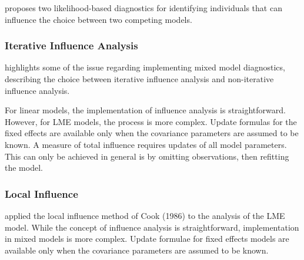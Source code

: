 \documentclass[12pt, a4paper]{report}
\theoremstyle{plain}
\theoremstyle{definition}
\theoremstyle{remark}
\begin{document}
	
	
	\citet{Demi} proposes two likelihood-based diagnostics for identifying individuals that can influence the choice between two competing models.
	
	
	
	\subsubsection{Iterative Influence Analysis}
	
	\citet{schabenberger} highlights some of the issue regarding implementing mixed model diagnostics, describing  the choice between  iterative influence analysis and  non-iterative influence analysis.
	
	For linear models, the implementation of influence analysis is straightforward. However, for LME models, the process is more complex. Update formulas for the fixed effects are available only when the covariance parameters are assumed to be known. A measure of total influence requires updates of all model parameters. This can only be achieved in general is by omitting observations, then refitting the model.
	
	
	\subsubsection{Local Influence}
	\citet{Beckman} applied the local influence method of Cook (1986) to the analysis of the LME model.
	While the concept of influence analysis is straightforward, implementation in mixed models is more complex. Update formulae for fixed effects models are available only when the covariance parameters are assumed to be known.
	
\end{document}
